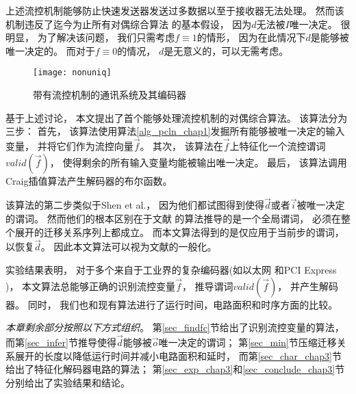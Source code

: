上述流控机制能够防止快速发送器发送过多数据以至于接收器无法处理。
然而该机制违反了迄今为止所有对偶综合算法
的基本假设，
因为$d$无法被$I$唯一决定。
很明显，
为了解决该问题，
我们只需考虑$f\equiv 1$的情形，
因为在此情况下$d$是能够被唯一决定的。
而对于$f\equiv 0$的情况，
$d$是无意义的，可以无需考虑。

\begin{figure}
\centerline{\texttt{[image: nonuniq]}}
\caption{带有流控机制的通讯系统及其编码器}
\label{fig:nonuniq}
\end{figure}


基于上述讨论，
本文提出了首个能够处理流控机制的对偶综合算法。
该算法分为三步：
首先，
该算法使用算法\ref{alg_pcln_chap1}发掘所有能够被唯一决定的输入变量，
并将它们作为流控向量$\vec{f}$。
其次，
该算法在$\vec{f}$上特征化一个流控谓词$valid(\vec{f})$，
使得剩余的所有输入变量均能被输出唯一决定。
最后，
该算法调用Craig插值算法产生解码器的布尔函数。

该算法的第二步类似于Shen et al.，
因为他们都试图得到使得$\vec{d}$或者$\vec{i}$被唯一决定的谓词。
然而他们的根本区别在于文献
的算法推导的是一个全局谓词，
必须在整个展开的迁移关系序列上都成立。
而本文算法得到的是仅应用于当前步的谓词，以恢复$\vec{d}$。
因此本文算法可以视为文献的一般化。

实验结果表明，
对于多个来自于工业界的复杂编码器(如以太网 和PCI Express )，
本文算法总能够正确的识别流控变量$\vec{f}$，
推导谓词$valid(\vec{f})$，
并产生解码器。
同时，
我们也和现有算法进行了运行时间，电路面积和时序方面的比较。



\emph{本章剩余部分按照以下方式组织}。
第\ref{sec_findfc}节给出了识别流控变量的算法，
而第\ref{sec_infer}节推导使得$\vec{d}$能够被$\vec{o}$唯一决定的谓词；
第\ref{sec_min}节压缩迁移关系展开的长度以降低运行时间并减小电路面积和延时，
而第\ref{sec_char_chap3}节给出了特征化解码器电路的算法；
第\ref{sec_exp_chap3}和\ref{sec_conclude_chap3}节分别给出了实验结果和结论。



